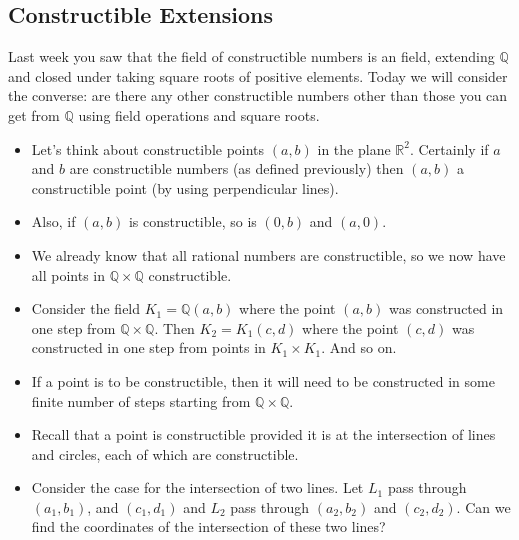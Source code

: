 \documentclass[12pt]{article}
\theoremstyle{plain}
\theoremstyle{definition}
\theoremstyle{remark}
\def\R{\mathbb R}
\def\Q{\mathbb Q}
\newcommand{\todayis}[1]{\clearpage{\rhead{\footnotesize #1}}}
\begin{document}
\todayis{Wednesday, January 23}

\subsection*{Constructible Extensions}
Last week you saw that the field of constructible numbers is an field, extending $\Q$ and closed under taking square roots of positive elements.  Today we will consider the converse: are there any other constructible numbers other than those you can get from $\Q$ using field operations and square roots.

\begin{itemize}
\item Let's think about constructible points $(a,b)$ in the plane $\R^2$.  Certainly if $a$ and $b$ are constructible numbers (as defined previously) then $(a,b)$ a constructible point (by using perpendicular lines). 
\item Also, if $(a,b)$ is constructible, so is $(0,b)$ and $(a,0)$.
\item We already know that all rational numbers are constructible, so we now have all points in $\Q\times\Q$ constructible.  
\item Consider the field $K_1 = \Q(a,b)$ where the point $(a,b)$ was constructed in one step from $\Q\times \Q$.  Then $K_2 = K_1(c,d)$ where the point $(c,d)$ was constructed in one step from points in $K_1\times K_1$.  And so on.
\item If a point is to be constructible, then it will need to be constructed in some finite number of steps starting from $\Q\times\Q$.
\item Recall that a point is constructible provided it is at the intersection of lines and circles, each of which are constructible.
\item Consider the case for the intersection of two lines.  Let $L_1$ pass through $(a_1,b_1)$, and $(c_1, d_1)$ and $L_2$ pass through $(a_2, b_2)$ and $(c_2, d_2)$.  Can we find the coordinates of the intersection of these two lines? 


\end{itemize}
\end{document}

